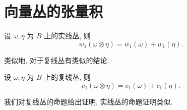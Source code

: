     \newpage
    \section{向量丛的张量积}
    \begin{proposition}
        设 $\omega,\eta$ 为 $B$ 上的实线丛, 则
        \begin{equation*}
            w_1(\omega\otimes\eta) = w_1(\omega) + w_1(\eta).
        \end{equation*}
    \end{proposition}
    类似地, 对于复线丛有类似的结论.
    \begin{proposition}
        设 $\omega,\eta$ 为 $B$ 上的复线丛, 则
        \begin{equation*}
            c_1(\omega\otimes\eta) = c_1(\omega) + c_1(\eta).
        \end{equation*}
    \end{proposition}
    我们对复线丛的命题给出证明, 实线丛的命题证明类似.
